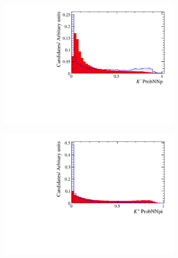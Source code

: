 \begin{figure}[!h]
\begin{subfigure}[t]{0.22\textwidth}
   \end{subfigure}
   \begin{subfigure}[t]{0.22\textwidth}
      \centering
      \includegraphics[width=1.0\textwidth]{figs/Selection/Phi_BDT_Var_Ds2KKPi_Phi_K1_MC15TuneV1_ProbNNp.pdf}
   \end{subfigure}
   \begin{subfigure}[t]{0.22\textwidth}
      \centering
      \includegraphics[width=1.0\textwidth]{figs/Selection/Phi_BDT_Var_Ds2KKPi_Phi_K0_MC15TuneV1_ProbNNpi.pdf}
   \end{subfigure}
   \begin{subfigure}[t]{0.22\textwidth}
      \centering

\end{subfigure}
\end{figure}
